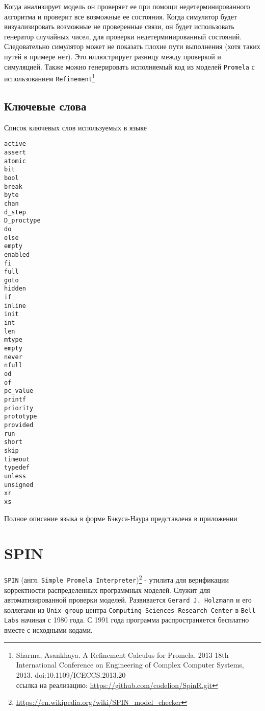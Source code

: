 \documentclass[12pt, twoside]{report}
\begin{document}
Когда  анализирует модель он проверяет ее при помощи недетерминированного
алгоритма и проверит все возможные ее состояния. Когда симулятор  будет
визуализировать возможные не проверенные связи, он будет использовать генератор
случайных чисел, для проверки недетерминированный состояний.
Следовательно симулятор может не показать плохие пути выполнения
(хотя таких путей в примере нет). Это иллюстрирует разницу между проверкой и симуляцией.
Также можно генерировать исполняемый код из моделей \texttt{Promela} с использованием \texttt{Refinement}\footnote{
 Sharma, Asankhaya. A Refinement Calculus for Promela. 2013 18th International Conference on Engineering of Complex Computer Systems, 2013. doi:10.1109/ICECCS.2013.20 \\
 ссылка на реализацию: \url{https://github.com/codelion/SpinR.git}
}


\subsection*{Ключевые слова}\label{promela_language_KEYWORDS}

Список ключевых слов используемых в языке

\begin{alltt}
active
assert
atomic
bit
bool
break
byte
chan
d_step
D_proctype
do
else
empty
enabled
fi
full
goto
hidden
if
inline
init
int
len
mtype
empty
never
nfull
od
of
pc_value
printf
priority
prototype
provided
run
short
skip
timeout
typedef
unless
unsigned
xr
xs
\end{alltt}

Полное описание языка в форме Бэкуса-Наура представленя в приложении 

\newpage
\section*{SPIN}\label{spin_MC}

\texttt{SPIN} (англ. \texttt{Simple Promela Interpreter})\footnote{\url{https://en.wikipedia.org/wiki/SPIN_model_checker}} -
утилита для верификации корректности распределенных программных моделей.
Служит для автоматизированной проверки моделей. Развивается \texttt{Gerard J. Holzmann} и
его коллегами из \texttt{Unix group} центра \texttt{Computing Sciences Research Center} в
\texttt{Bell Labs} начиная с 1980 года. С 1991 года программа распространяется
бесплатно вместе с исходными кодами.
\end{document}
